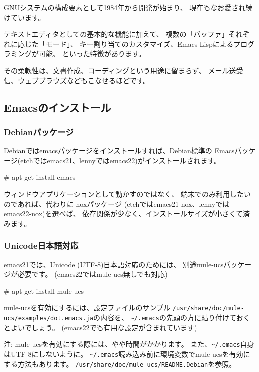 \documentclass[mingoth,a4paper]{jsarticle}
\begin{document}
GNUシステムの構成要素として1984年から開発が始まり、
現在もなお愛され続けています。

テキストエディタとしての基本的な機能に加えて、
複数の「バッファ」それぞれに応じた「モード」、
キー割り当てのカスタマイズ、Emacs Lispによるプログラミングが可能、
といった特徴があります。

その柔軟性は、文書作成、コーディングという用途に留まらず、
メール送受信、ウェブブラウズなどもこなせるほどです。

\subsection{Emacsのインストール}
\subsubsection{Debianパッケージ}

Debianではemacsパッケージをインストールすれば、Debian標準の
Emacsパッケージ(etchではemacs21、lennyではemacs22)がインストールされます。

\begin{commandline}
# apt-get install emacs
\end{commandline}

ウィンドウアプリケーションとして動かすのではなく、
端末でのみ利用したいのであれば、代わりに-noxパッケージ
(etchではemacs21-nox、lennyではemacs22-nox)を選べば、
依存関係が少なく、インストールサイズが小さくて済みます。

\subsubsection{Unicode日本語対応}

emacs21では、Unicode (UTF-8)日本語対応のためには、
別途mule-ucsパッケージが必要です。
(emacs22ではmule-ucs無しでも対応)

\begin{commandline}
# apt-get install mule-ucs
\end{commandline}

mule-ucsを有効にするには、設定ファイルのサンプル
\verb|/usr/share/doc/mule-ucs/examples/dot.emacs.ja|の内容を、
\verb|~/.emacs|の先頭の方に貼り付けておくとよいでしょう。
(emacs22でも有用な設定が含まれています)

注: mule-ucsを有効にする際には、やや時間がかかります。
また、\verb|~/.emacs|自身はUTF-8にしないように。
\verb|~/.emacs|読み込み前に環境変数でmule-ucsを有効にする方法もあります。
\verb|/usr/share/doc/mule-ucs/README.Debian|を参照。
\end{document}
